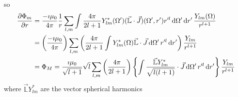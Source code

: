 \documentclass[a4paper,twoside,master.tex]{subfiles}
\begin{document}
so
\begin{align}
    \pdv{\Phi_m}{r} &= \frac{-\imath \mu_0}{4 \pi} \frac{1}{r} \sum_{l,m} \int \frac{4 \pi}{2l+1} Y_{lm}^*(\Omega')( \vec{\mathbb{L}} \cdot \vec{J})(\Omega', r')r'^l \dd{\Omega'} \dd{r'} \frac{Y_{lm} (\Omega)}{r^{l+1}}\\
    &= \left( \frac{-\imath \mu_0}{4 \pi} \right) \sum_{l,m} \left(\frac{4 \pi}{2l + 1} \int Y_{lm}^*(\Omega) \vec{\mathbb{L}} \cdot \vec{J} \dd{\Omega'} r'^l \dd{r'}\right) \frac{Y_{lm}}{r^{l+1}}\\
    &= \Phi_M = \frac{\imath \mu_0}{\sqrt{l+1}} \sqrt{l} \sum_{l,m} \left( \frac{4 \pi}{2l+1} \right)\left\{ \int \frac{ \vec{\mathbb{L}} Y_{lm}^*}{\sqrt{l(l+1)}} \cdot \vec{J} \dd{\Omega'} r'^l \dd{r'} \right\} \frac{Y_{lm}}{r^{l+1}}
\end{align}
where $ \vec{\mathbb{L}} Y_{lm}^* $ are the vector spherical harmonics
\end{document}
